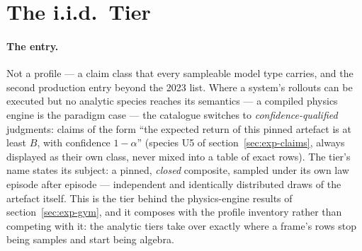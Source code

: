 

\section{The i.i.d.\ Tier}
\label{sec:mt-iid}

\paragraph{The entry.} Not a profile --- a claim class that every
sampleable model type carries, and the second production entry
beyond the 2023 list. Where a system's rollouts can be executed but
no analytic species reaches its semantics --- a compiled physics
engine is the paradigm case --- the catalogue switches to
\emph{confidence-qualified} judgments: claims of the form ``the
expected return of this pinned artefact is at least $B$, with
confidence $1-\alpha$'' (species U5 of section~\ref{sec:exp-claims},
always displayed as their own class, never mixed into a table of
exact rows). The tier's name states its subject: a pinned,
\emph{closed} composite, sampled under its own law episode after
episode --- independent and identically distributed draws of the
artefact itself. This is the tier behind the physics-engine results
of section~\ref{sec:exp-gym}, and it composes with the profile
inventory rather than competing with it: the analytic tiers take
over exactly where a frame's rows stop being samples and start being
algebra.

